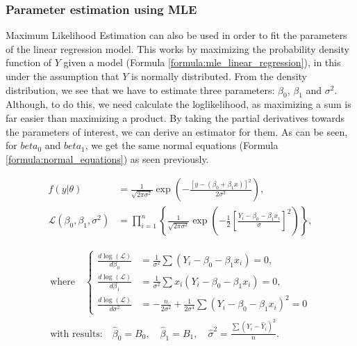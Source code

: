 \subsubsection{Parameter estimation using MLE}

Maximum Likelihood Estimation can also be used in order to fit the parameters of the linear regression model.
This works by maximizing the probability density function of $Y$ given a model (Formula \ref{formula:mle_linear_regression}), in this under the assumption that $Y$ is normally distributed.
From the density distribution, we see that we have to estimate three parameters: $\beta_0$, $\beta_1$ and $\sigma^2$.
Although, to do this, we need calculate the loglikelihood, as maximizing a sum is far easier than maximizing a product.
By taking the partial derivatives towards the parameters of interest, we can derive an estimator for them.
As can be seen, for $beta_0$ and $beta_1$, we get the same normal equations (Formula \ref{formula:normal_equations}) as seen previously.

\begin{equation}
    \begin{aligned}
        f(y|\theta) &= \frac{1}{\sqrt{2\pi\sigma^2}} \exp\left(- \frac{\left[y - (\beta_0 + \beta_1x)\right]^2}{2\sigma^2}\right), \\[10pt]
        \mathcal{L}(\beta_0, \beta_1, \sigma^2) &= \prod_{i=1}^n \left\{ \frac{1}{\sqrt{2\pi\sigma^2}} \exp\left(-\frac{1}{2} \left[\frac{Y_i-\beta_0-\beta_1x_i}{\sigma}\right]^2\right)\right\},
    \end{aligned}
\end{equation}

\begin{equation}
    \begin{aligned}
    \text{where} \quad 
    \left\{
    \begin{aligned}
        \frac{d \log (\mathcal{L})}{d\beta_0} &= \frac{1}{\sigma^2} \sum\left(Y_i - \beta_0 - \beta_1x_i\right) = 0, \\
        \frac{d \log (\mathcal{L})}{d\beta_1} &= \frac{1}{\sigma^2} \sum x_i \left(Y_i - \beta_0 - \beta_1x_i\right) = 0, \\
        \frac{d \log (\mathcal{L})}{d\sigma^2} &= -\frac{n}{2\sigma^2} + \frac{1}{2\sigma^4} \sum \left(Y_i - \beta_0 - \beta_1 x_i\right)^2 = 0
    \end{aligned}
    \right. \\[10pt]
    \text{with results:} \quad \hat{\beta}_0 = B_0, \quad \hat{\beta}_1 = B_1, \quad \hat{\sigma}^2 = \frac{\sum(Y_i - \hat{Y}_i)^2}{n}.
    \end{aligned}
\end{equation}
    
    
    

